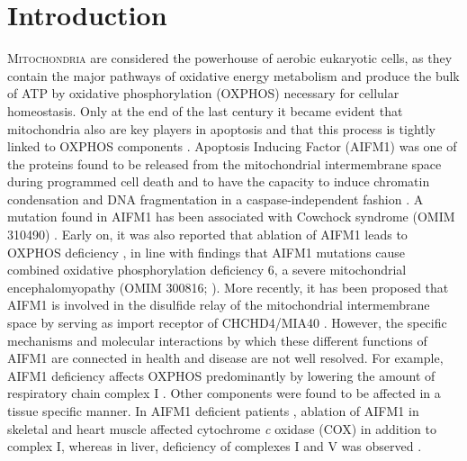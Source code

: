 \section{Introduction}
\lettrine[lraise=0.1, nindent=0em, slope=-.5em]{M}{itochondria} are considered the powerhouse of aerobic eukaryotic cells, as they contain the major pathways of oxidative energy metabolism and produce the bulk of ATP by oxidative phosphorylation (OXPHOS) necessary for cellular homeostasis. Only at the end of the last century it became evident that mitochondria also are key players in apoptosis and that this process is tightly linked to OXPHOS components \cite{RN1}. Apoptosis Inducing Factor (AIFM1) was one of the proteins found to be released from the mitochondrial intermembrane space during programmed cell death and to have the capacity to induce chromatin condensation and DNA fragmentation in a caspase-independent fashion \cite{RN2}. A mutation found in AIFM1 has been associated with Cowchock syndrome (OMIM 310490) \cite{RN3}. Early on, it was also reported that ablation of AIFM1 leads to OXPHOS deficiency \cite{RN4}, in line with findings that AIFM1 mutations cause combined oxidative phosphorylation deficiency 6, a severe mitochondrial encephalomyopathy (OMIM 300816; \cite{RN5}). More recently, it has been proposed that AIFM1 is involved in the disulfide relay of the mitochondrial intermembrane space by serving as import receptor of CHCHD4/MIA40 \cite{RN8, RN7, RN6}. However, the specific mechanisms and molecular interactions by which these different functions of AIFM1 are connected in health and disease are not well resolved. For example, AIFM1 deficiency affects OXPHOS predominantly by lowering the amount of respiratory chain complex I \cite{RN4}. Other components were found to be affected in a tissue specific manner. In AIFM1 deficient patients \cite{RN5}, ablation of AIFM1 in skeletal and heart muscle affected cytochrome \emph{c} oxidase (COX) in addition to complex I, whereas in liver, deficiency of complexes I and V was observed \cite{RN10, RN9}.


